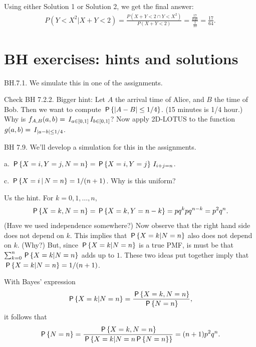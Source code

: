 \begin{exercise}
\begin{solution}
            Using either Solution 1 or Solution 2, we get the final answer:
            \begin{align*}
                P(Y<X^2|X+Y<2) = \frac{P(X+Y<2\cap Y < X^2)}{P(X+Y<2)} = \frac{\frac{17}{640}}{\frac{1}{10}} = \frac{17}{64}.
            \end{align*}
\end{solution}
\end{exercise}




\section{BH exercises: hints and solutions}
\label{sec:hints-solut-exerc}



\begin{exercise}
BH.7.1. We simulate this in one of the assignments.
\begin{hint}
Check BH 7.2.2. Bigger hint: Let $A$ the arrival time of Alice, and $B$ the time of Bob. Then we want to compute $\P{|A-B|\leq 1/4}$.  (15 minutes is 1/4 hour.)  Why is $f_{A,B}(a,b) = \1{a\in[0,1]}\1{b\in [0,1]}$? Now apply 2D-LOTUS to the function $g(a,b) = \1{|a-b|\leq 1/4}$.
\end{hint}
\begin{solution}
\end{solution}
\end{exercise}


\begin{exercise}
BH 7.9. We'll develop a simulation for this in the assignments.
\begin{hint}
a. $\P{X=i, Y=j, N=n} = \P{X=i, Y=j} \1{i+j=n}$.

c. $\P{X=i\given N=n} = 1/(n+1)$. Why is this uniform?
\end{hint}
\begin{solution}
Us the hint. For $k=0, 1, \ldots, n$,
\begin{equation*}
\P{X=k, N=n} = \P{X=k, Y=n-k} = pq^k p q^{n-k} = p^2 q^{n}.
\end{equation*}
(Have we used independence somewhere?)
Now observe that the right hand side does not depend on $k$. This implies that $\P{X=k|N=n}$  also does not depend on $k$. (Why?) But, since $\P{X=k|N=n}$ is a true PMF,  is must be that $\sum_{k=0}^{n}\P{X=k|N=n}$ adds up to $1$. These two ideas put together imply that $\P{X=k|N=n} = 1/(n+1)$.

With Bayes' expression
\begin{equation*}
\P{X=k|N=n} = \frac{\P{X=k, N=n}}{\P{N=n}},
\end{equation*}
it follows that
\begin{equation*}
\P{N=n} = \frac{\P{X=k, N=n}}{\P{X=k|N=n\P{N=n}}} = (n+1) p^2q^{n}.
\end{equation*}
\end{solution}
\end{exercise}

